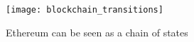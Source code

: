 \begin{figure}[ht!]
    \centering
    \texttt{[image: blockchain\_transitions]}
    \caption{Ethereum can be seen as a chain of states~\cite{visual}}
    \label{fig:worldstate_update}
\end{figure}